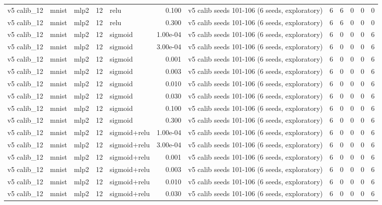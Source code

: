 \begin{table}[htbp]
{\begin{tabular}{@{}lllrlrlrrrrr@{}}
v5 calib\_12 & mnist & mlp2 & 12 & relu & 0.100 & v5 calib seeds 101-106 (6 seeds, exploratory) & 6 & 6 & 0 & 0 & 0 \\
v5 calib\_12 & mnist & mlp2 & 12 & relu & 0.300 & v5 calib seeds 101-106 (6 seeds, exploratory) & 6 & 6 & 0 & 0 & 0 \\
v5 calib\_12 & mnist & mlp2 & 12 & sigmoid & 1.00e-04 & v5 calib seeds 101-106 (6 seeds, exploratory) & 6 & 0 & 0 & 0 & 6 \\
v5 calib\_12 & mnist & mlp2 & 12 & sigmoid & 3.00e-04 & v5 calib seeds 101-106 (6 seeds, exploratory) & 6 & 0 & 0 & 0 & 6 \\
v5 calib\_12 & mnist & mlp2 & 12 & sigmoid & 0.001 & v5 calib seeds 101-106 (6 seeds, exploratory) & 6 & 0 & 0 & 0 & 6 \\
v5 calib\_12 & mnist & mlp2 & 12 & sigmoid & 0.003 & v5 calib seeds 101-106 (6 seeds, exploratory) & 6 & 0 & 0 & 0 & 6 \\
v5 calib\_12 & mnist & mlp2 & 12 & sigmoid & 0.010 & v5 calib seeds 101-106 (6 seeds, exploratory) & 6 & 0 & 0 & 0 & 6 \\
v5 calib\_12 & mnist & mlp2 & 12 & sigmoid & 0.030 & v5 calib seeds 101-106 (6 seeds, exploratory) & 6 & 0 & 0 & 0 & 6 \\
v5 calib\_12 & mnist & mlp2 & 12 & sigmoid & 0.100 & v5 calib seeds 101-106 (6 seeds, exploratory) & 6 & 0 & 0 & 0 & 6 \\
v5 calib\_12 & mnist & mlp2 & 12 & sigmoid & 0.300 & v5 calib seeds 101-106 (6 seeds, exploratory) & 6 & 0 & 0 & 0 & 6 \\
v5 calib\_12 & mnist & mlp2 & 12 & sigmoid+relu & 1.00e-04 & v5 calib seeds 101-106 (6 seeds, exploratory) & 6 & 0 & 0 & 0 & 6 \\
v5 calib\_12 & mnist & mlp2 & 12 & sigmoid+relu & 3.00e-04 & v5 calib seeds 101-106 (6 seeds, exploratory) & 6 & 0 & 0 & 0 & 6 \\
v5 calib\_12 & mnist & mlp2 & 12 & sigmoid+relu & 0.001 & v5 calib seeds 101-106 (6 seeds, exploratory) & 6 & 0 & 0 & 0 & 6 \\
v5 calib\_12 & mnist & mlp2 & 12 & sigmoid+relu & 0.003 & v5 calib seeds 101-106 (6 seeds, exploratory) & 6 & 0 & 0 & 0 & 6 \\
v5 calib\_12 & mnist & mlp2 & 12 & sigmoid+relu & 0.010 & v5 calib seeds 101-106 (6 seeds, exploratory) & 6 & 0 & 0 & 0 & 6 \\
v5 calib\_12 & mnist & mlp2 & 12 & sigmoid+relu & 0.030 & v5 calib seeds 101-106 (6 seeds, exploratory) & 6 & 0 & 0 & 0 & 6 \\

\end{tabular}}
\end{table}
